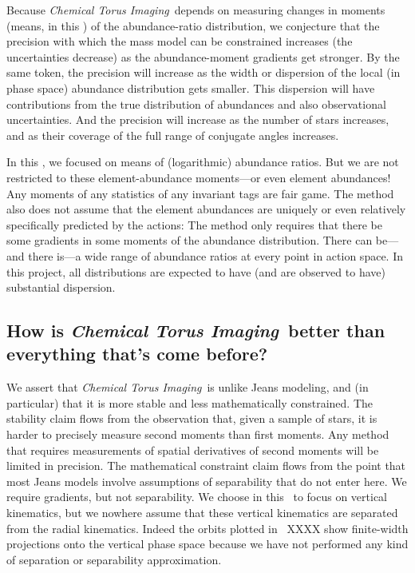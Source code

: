\documentclass[modern]{aastex63}
\newcommand{\methodname}{\textsl{Chemical Torus Imaging}}
\begin{document}
Because \methodname\ depends on measuring changes in moments
(means, in this \documentname) of the
abundance-ratio distribution, we
conjecture that the precision with which the mass model can be
constrained increases (the uncertainties decrease) as the
abundance-moment gradients get stronger.
By the same token, the precision will increase as the width or
dispersion of the local (in phase space) abundance distribution gets
smaller.
This dispersion will have contributions from the true distribution of
abundances and also observational uncertainties.
And the precision will increase as the number of stars increases,
and as their coverage of the full range of conjugate angles increases.

In this \documentname, we focused on means of (logarithmic) abundance
ratios.
But we are not restricted to these element-abundance moments---or even
element abundances! Any moments of any statistics of any invariant tags
are fair game. The method also does not assume that the element abundances
are uniquely or even relatively specifically predicted by the actions:
The method only requires that there be some gradients in some moments of
the abundance distribution. There can be---and there is---a wide range of
abundance ratios at every point in action space.
In this project, all distributions are expected to have (and are observed
to have) substantial dispersion.

\subsection{How is \methodname\ better than everything that's come before?}

We assert that \methodname\ is unlike Jeans modeling, and (in
particular) that it is more stable and less mathematically constrained.
The stability claim flows from the observation that, given a sample of
stars, it is harder to precisely measure second moments than first
moments.
Any method that requires measurements of spatial derivatives of second
moments will be limited in precision.
The mathematical constraint claim flows from the point that most Jeans
models involve assumptions of separability that do not enter here.
We require gradients, but not separability.
We choose in this \documentname\ to focus on vertical kinematics, but
we nowhere assume that these vertical kinematics are separated from the
radial kinematics.
Indeed the orbits plotted in \figurename~XXXX
show finite-width projections onto the vertical phase space because we
have not performed any kind of separation or separability approximation.
\end{document}
